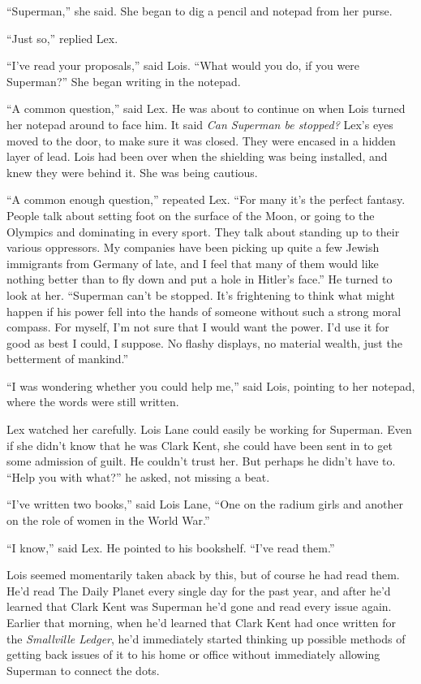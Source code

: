 \documentclass[ebook,12pt]{memoir}
\begin{document}
``Superman,'' she said. She began to dig a pencil and notepad from her
purse.

``Just so,'' replied Lex.

``I've read your proposals,'' said Lois. ``What would you do, if you
were Superman?'' She began writing in the notepad.

``A common question,'' said Lex. He was about to continue on when Lois
turned her notepad around to face him. It said \emph{Can Superman be
stopped?} Lex's eyes moved to the door, to make sure it was closed. They
were encased in a hidden layer of lead. Lois had been over when the
shielding was being installed, and knew they were behind it. She was
being cautious.

``A common enough question,'' repeated Lex. ``For many it's the perfect
fantasy. People talk about setting foot on the surface of the Moon, or
going to the Olympics and dominating in every sport. They talk about
standing up to their various oppressors. My companies have been picking
up quite a few Jewish immigrants from Germany of late, and I feel that
many of them would like nothing better than to fly down and put a hole
in Hitler's face.'' He turned to look at her. ``Superman can't be
stopped. It's frightening to think what might happen if his power fell
into the hands of someone without such a strong moral compass. For
myself, I'm not sure that I would want the power. I'd use it for good as
best I could, I suppose. No flashy displays, no material wealth, just
the betterment of mankind.''

``I was wondering whether you could help me,'' said Lois, pointing to
her notepad, where the words were still written.

Lex watched her carefully. Lois Lane could easily be working for
Superman. Even if she didn't know that he was Clark Kent, she could have
been sent in to get some admission of guilt. He couldn't trust her. But
perhaps he didn't have to. ``Help you with what?'' he asked, not missing
a beat.

``I've written two books,'' said Lois Lane, ``One on the radium girls
and another on the role of women in the World War.''

``I know,'' said Lex. He pointed to his bookshelf. ``I've read them.''

Lois seemed momentarily taken aback by this, but of course he had read
them. He'd read The Daily Planet every single day for the past year, and
after he'd learned that Clark Kent was Superman he'd gone and read every
issue again. Earlier that morning, when he'd learned that Clark Kent had
once written for the \emph{Smallville Ledger}, he'd immediately started
thinking up possible methods of getting back issues of it to his home or
office without immediately allowing Superman to connect the dots.
\end{document}

